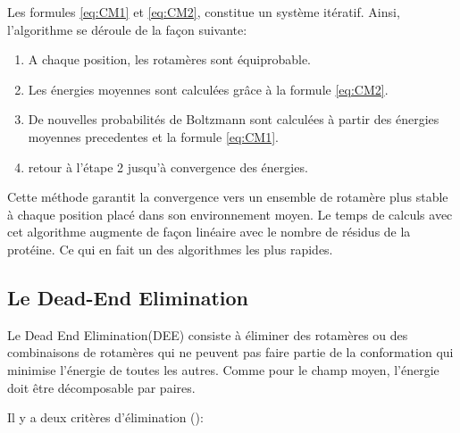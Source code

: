 Les formules \ref{eq:CM1} et \ref{eq:CM2}, constitue un système itératif. Ainsi, l'algorithme se déroule de la façon suivante:


\begin{enumerate}
\item  A chaque position, les rotamères sont équiprobable.
\item  Les énergies moyennes sont calculées grâce à la formule \ref{eq:CM2}.
\item  De nouvelles probabilités de Boltzmann sont calculées à partir des énergies moyennes precedentes et la formule \ref{eq:CM1}.
\item  retour à l'étape 2 jusqu'à convergence des énergies.
\end{enumerate}

Cette méthode garantit la convergence vers un ensemble de rotamère plus stable à chaque position placé dans son \og environnement moyen\fg . Le temps de calculs avec cet algorithme augmente  de façon linéaire avec le nombre de résidus de la protéine. Ce qui en fait un des algorithmes les plus rapides.

\subsection{Le Dead-End Elimination}

Le \og Dead End Elimination\fg (DEE)  consiste à éliminer des rotamères ou des combinaisons de rotamères qui ne peuvent pas faire partie de la conformation qui minimise l'énergie de toutes les autres. Comme pour le champ moyen, l'énergie doit être décomposable par paires.

Il y a deux critères d'élimination (\cite{Desmet92}):

